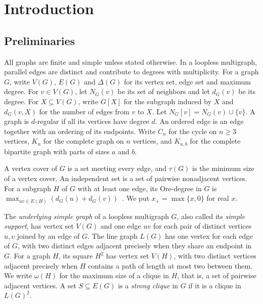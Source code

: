 \section{Introduction}\label{sec:intro}

\subsection{Preliminaries}\label{sec:prelim}

All graphs are finite and simple unless stated otherwise. In a loopless
multigraph, parallel edges are distinct and contribute to degrees with
multiplicity. For a graph $G$, write $V(G)$, $E(G)$ and $\Delta(G)$ for
its vertex set, edge set and maximum degree. For $v\in V(G)$, let
$N_G(v)$ be its set of neighbors and let $d_G(v)$ be its degree.
For $X\subseteq V(G)$, write $G[X]$ for the subgraph induced by $X$ and
$d_G(v,X)$ for the number of edges from $v$ to $X$. Let $N_G[v]=N_G(v)\cup\{v\}$.
A graph is
$d$-regular if all its vertices have degree $d$. An ordered edge is an
edge together with an ordering of its endpoints.
Write $C_n$ for the cycle on $n\geq 3$ vertices, $K_n$ for the complete
graph on $n$ vertices, and $K_{a,b}$ for the complete bipartite graph with
parts of sizes $a$ and $b$.

A vertex cover of $G$ is a set meeting every edge, and $\tau(G)$ is
the minimum size of a vertex cover. An independent set is a set of
pairwise nonadjacent vertices. For a subgraph $H$ of $G$ with at least
one edge, its Ore-degree in $G$ is
$\max_{uv\in E(H)}(d_G(u)+d_G(v))$~\cite{FaronPostle2019}.
We put $x_+=\max\{x,0\}$ for real $x$.

The \emph{underlying simple graph} of a loopless multigraph $G$, also
called its \emph{simple support}, has vertex set $V(G)$ and one edge
$uv$ for each pair of distinct vertices $u,v$ joined by an edge of $G$.
The line graph $L(G)$ has
one vertex for each edge of $G$, with two distinct edges adjacent
precisely when they share an endpoint in $G$. For a graph $H$,
its square $H^2$ has vertex set $V(H)$, with two distinct vertices
adjacent precisely when $H$ contains a path of length at most two
between them. We write $\omega(H)$ for the maximum size of a clique in
$H$, that is, a set of pairwise adjacent vertices. A set
$S\subseteq E(G)$ is a \emph{strong clique} in $G$ if it is a clique
in $L(G)^2$.

